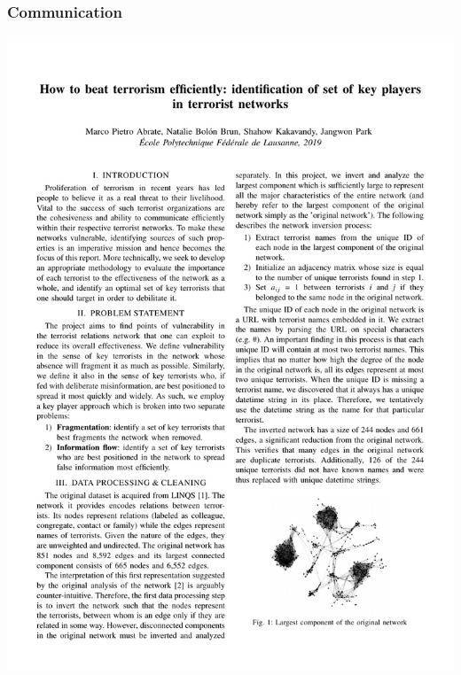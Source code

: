\documentclass[aspectratio=169]{beamer}
\begin{document}

\begin{frame}
	\frametitle{Communication}
	\begin{minipage}{0.48\linewidth}
		\includegraphics[width=\linewidth,trim={0 50cm 0 0},clip]{project_27_report} \\


\end{minipage}
\end{frame}
\end{document}
